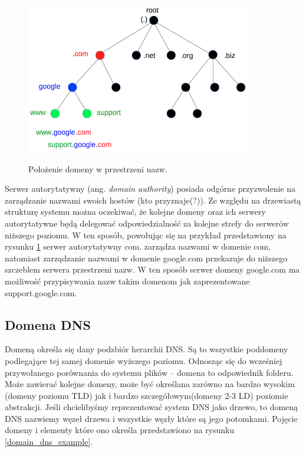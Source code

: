 \begin{center}
	\begin{figure}
	\includegraphics[scale=1]{image/domain_tree}\label{example_domain_tree}
	\caption{Położenie domeny w przestrzeni nazw. \cite{domain_tree_src}}
	\end{figure}
\end{center}

Serwer autorytatywny (ang. \textit{domain authority}) posiada odgórne przyzwolenie na zarządzanie nazwami swoich hostów (kto przyznaje(?)). Ze względu na drzewiastą strukturę systemu można oczekiwać, że kolejne domeny oraz ich serwery autorytatywne będą delegować odpowiedzialność za kolejne strefy do serwerów niższego poziomu. W ten sposób, powołując się na przykład przedstawiony na rysunku \ref{example_domain_tree} serwer autorytatywny com. zarządza nazwami w domenie com, natomiast zarządzanie nazwami w domenie google.com przekazuje do niższego szczeblem serwera przestrzeni nazw. W ten sposób serwer domeny google.com ma możliwość przypisywania nazw takim domenom jak zaprezentowane support.google.com.

\subsection{Domena DNS}
Domeną określa się dany podzbiór herarchii DNS. Są to wszystkie poddomeny podlegające tej samej domenie wyższego poziomu. Odnosząc się do wcześniej przywołanego porównania do systemu plików -- domena to odpowiednik folderu. Może zawierać kolejne domeny, może być określana zarówno na bardzo wysokim (domeny poziomu TLD) jak i bardzo szczegółowym(domeny 2-3 LD) poziomie abstrakcji. Jeśli chcielibyśmy reprezentować system DNS jako drzewo, to domeną DNS nazwiemy węzeł drzewa i wszystkie węzły które są jego potomkami. Pojęcie domeny i elementy które ono określa przedstawiono na rysunku \ref{domain_dns_example}.

